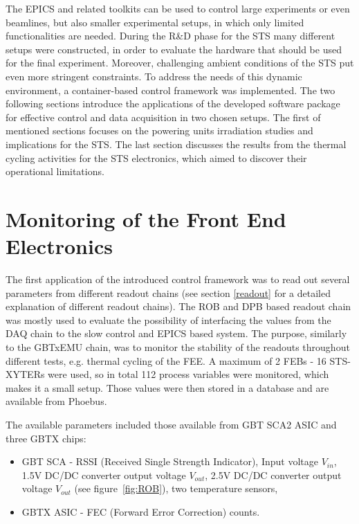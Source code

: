 The \gls{EPICS} and related toolkits can be used to control large experiments or even beamlines, but also smaller experimental setups, in which only limited functionalities are needed. During the R\&D phase for the \gls{STS} many different setups were constructed, in order to evaluate the hardware that should be used for the final experiment. Moreover, challenging ambient conditions of the \gls{STS} put even more stringent constraints. To address the needs of this dynamic environment, a container-based control framework was implemented. 
The two following sections introduce the applications of the developed software package for effective control and data acquisition in two chosen setups. The first of mentioned sections focuses on the powering units irradiation studies and implications for the \gls{STS}. The last section discusses the results from the thermal cycling activities for the \gls{STS} electronics, which aimed to discover their operational limitations. 

\section{Monitoring of the Front End Electronics}
The first application of the introduced control framework was to read out several parameters from different readout chains (see section \ref{readout} for a detailed explanation of different readout chains). The \gls{ROB} and \gls{DPB} based readout chain was mostly used to evaluate the possibility of interfacing the values from the \gls{DAQ} chain to the slow control and \gls{EPICS} based system. The purpose, similarly to the GBTxEMU chain, was to monitor the stability of the readouts throughout different tests, e.g. thermal cycling of the \gls{FEE}. A maximum of 2 \glspl{FEB} - 16 STS-XYTERs were used, so in total 112 process variables were monitored, which makes it a small setup. Those values were then stored in a database and are available from Phoebus. 

The available parameters included those available from \gls{GBT} \gls{SCA2} \gls{ASIC} \cite{GBT_SCA_ASIC} and three GBTX chips: 
\begin{itemize}
    \item GBT SCA - RSSI (Received Single Strength Indicator), Input voltage $V_{in}$, 1.5V DC/DC converter output voltage $V_{out}$, 2.5V DC/DC converter output voltage $V_{out}$ (see figure~\ref{fig:ROB}), two temperature sensors,
    \item GBTX \gls{ASIC} - FEC (Forward Error Correction) counts.
\end{itemize}

